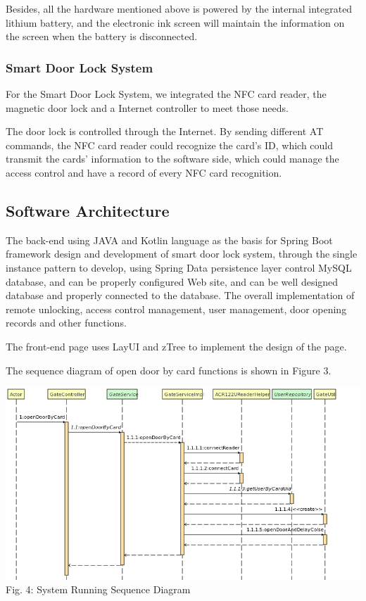 \documentclass[11pt, a4paper]{article}
\begin{document}
Besides, all the hardware mentioned above is powered by the internal integrated lithium battery, and the electronic ink screen will maintain the information on the screen when the battery is disconnected.

\subsubsection{Smart Door Lock System}

For the Smart Door Lock System, we integrated the NFC card reader, the magnetic door lock and a Internet controller to meet those needs.

The door lock is controlled through the Internet. By sending different AT commands, the NFC card reader could recognize the card's ID, which could transmit the cards' information to the software side, which could manage the access control and have a record of every NFC card recognition.


\subsection{Software Architecture}
The back-end using JAVA and Kotlin language as the basis for Spring Boot framework design and development of smart door lock system, through the single instance pattern to develop, using Spring Data persistence layer control MySQL database, and can be properly configured Web site, and can be well designed database and properly connected to the database.  The overall implementation of remote unlocking, access control management, user management, door opening records and other functions.

The front-end page uses LayUI and zTree to implement the design of the page.

The sequence diagram of open door by card functions is shown in Figure 3.

\begin{center}

    \includegraphics[scale=0.4]{pic3.png} \\
    Fig. 4: System Running Sequence Diagram

\end{center}
\end{document}
